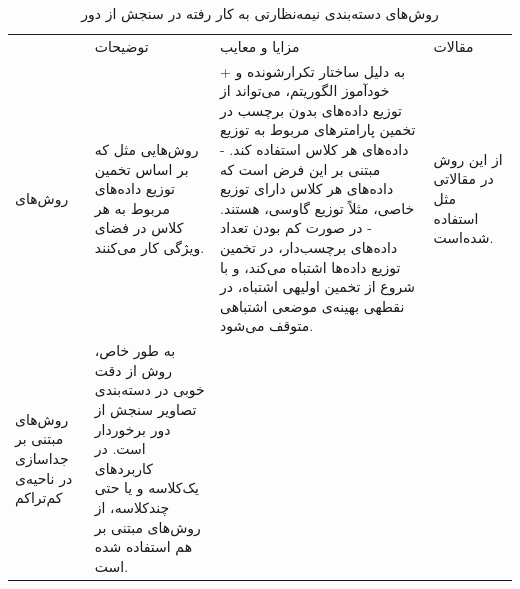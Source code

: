 \documentclass[11pt]{article}
\begin{document}
\begin{table}
\caption{روش‌های دسته‌بندی نیمه‌نظارتی به کار رفته در سنجش از دور}
\label{table:prev_works}
\begin{center}
\begin{tabular}{p{2cm}|p{3cm}|p{8cm}|p{3cm}|}
\cline{2-4}
 & توضیحات & مزایا و معایب & مقالات \\ 
\cline{1-4}

\multicolumn{1}{|p{2cm}|}{روش‌های \generative{}} &{\footnotesize روش‌هایی مثل \EM{} که بر اساس تخمین توزیع داده‌های مربوط به هر کلاس در فضای ویژگی کار می‌کنند.}& {\footnotesize 
+ به دلیل ساختار تکرارشونده و خودآموز الگوریتم، می‌تواند از توزیع داده‌های بدون برچسب در تخمین پارامترهای مربوط به توزیع داده‌های هر کلاس استفاده کند. \newline
- مبتنی بر این فرض است که داده‌های هر کلاس دارای توزیع خاصی، مثلاً توزیع گاوسی، هستند. \newline
- در صورت کم بودن تعداد داده‌های برچسب‌دار، در تخمین توزیع داده‌ها اشتباه می‌کند، و با شروع از تخمین اولیهی اشتباه، در نقطهی بهینه‌ی موضعی اشتباهی متوقف می‌شود.
} & {\footnotesize از این روش در مقالاتی مثل \cite{EM_RS_1}  استفاده شده‌است.}\\

\cline{1-4}
\multicolumn{1}{|p{2cm}|}{روش‌های مبتنی بر جداسازی در ناحیه‌ی کم‌تراکم} &

{\footnotesize 
به طور خاص، روش \SVM{} از دقت خوبی در دسته‌بندی تصاویر سنجش از دور برخوردار است. در کاربردهای یک‌کلاسه و یا حتی چندکلاسه، از روش‌های مبتنی بر \SVDD{} هم استفاده شده است.
} &


\end{tabular}
\end{center}
\end{table}
\end{document}
